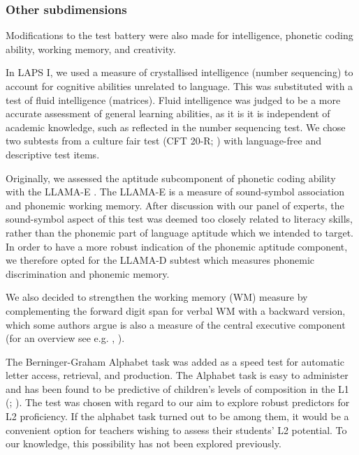 \documentclass[output=paper]{langsci/langscibook}
\begin{document}
 \subsubsection{Other subdimensions}

Modifications to the test battery were also made for intelligence, phonetic coding ability, working memory, and creativity. 

In LAPS I, we used a measure of crystallised intelligence (number sequencing) to account for cognitive abilities unrelated to language. This was substituted with a test of fluid intelligence (matrices). Fluid intelligence was judged to be a more accurate assessment of general learning abilities, as it is it is independent of academic knowledge, such as reflected in the number sequencing test. We chose two subtests from a culture fair test (CFT 20-R; \citealt{Weiss2006}) with language-free and descriptive test items.

Originally, we assessed the aptitude subcomponent of phonetic coding ability with the LLAMA-E \citep{MearaEtAl2001}. The LLAMA-E is a measure of sound-symbol association and phonemic working memory. After discussion with our panel of experts, the sound-symbol aspect of this test was deemed too closely related to literacy skills, rather than the phonemic part of language aptitude which we intended to target. In order to have a more robust indication of the phonemic aptitude component, we therefore opted for the LLAMA-D subtest \citep{MearaEtAl2001} which measures phonemic discrimination and phonemic memory. 

We also decided to strengthen the working memory (WM) measure by complementing the forward digit span for verbal WM with a backward version, which some authors argue is also a measure of the central executive component (for an overview see e.g. \citealt{St-ClairEtAl2013}, \citealt{HilbertEtAl2014}). 

The Berninger-Graham Alphabet task \citep{BerningerEtAl1992} was added as a speed test for automatic letter access, retrieval, and production. The Alphabet task is easy to administer and has been found to be predictive of children’s levels of composition in the L1 (\citealt{BerningerEtAl1997}; \citealt{GrahamEtAl2006}). The test was chosen with regard to our aim to explore robust predictors for L2 proficiency. If the alphabet task turned out to be among them, it would be a convenient option for teachers wishing to assess their students’ L2 potential. To our knowledge, this possibility has not been explored previously.
\end{document}
